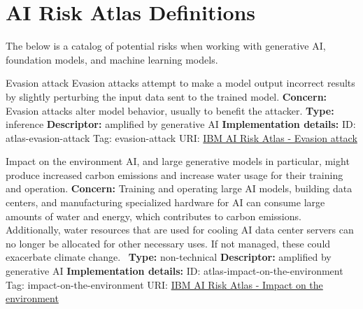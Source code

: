 \section{AI Risk Atlas Definitions}
The below is a catalog of potential risks when working with generative AI, foundation models, and machine learning models.


\begin{definitionbox}{Evasion attack}
Evasion attacks attempt to make a model output incorrect results by slightly perturbing the input data sent to the trained model.\newline\newline
\textbf{Concern: }Evasion attacks alter model behavior, usually to benefit the attacker.\newline\newline
\textbf{Type: }inference\newline
\textbf{Descriptor: }amplified by generative AI \newline\newline
\textbf{Implementation details: } \newline
ID: atlas-evasion-attack \newline
Tag: evasion-attack \newline
URI:  \href{https://www.ibm.com/docs/en/watsonx/saas?topic=SSYOK8/wsj/ai-risk-atlas/evasion-attack.html}{IBM AI Risk Atlas - Evasion attack}\newline
\end{definitionbox}
\begin{definitionbox}{Impact on the environment}
AI, and large generative models in particular, might produce increased carbon emissions and increase water usage for their training and operation.\newline\newline
\textbf{Concern: }Training and operating large AI models, building data centers, and manufacturing specialized hardware for AI can consume large amounts of water and energy, which contributes to carbon emissions. Additionally, water resources that are used for cooling AI data center servers can no longer be allocated for other necessary uses. If not managed, these could exacerbate climate change. \newline\newline
\textbf{Type: }non-technical\newline
\textbf{Descriptor: }amplified by generative AI \newline\newline
\textbf{Implementation details: } \newline
ID: atlas-impact-on-the-environment \newline
Tag: impact-on-the-environment \newline
URI:  \href{https://www.ibm.com/docs/en/watsonx/saas?topic=SSYOK8/wsj/ai-risk-atlas/impact-on-the-environment.html}{IBM AI Risk Atlas - Impact on the environment}\newline
\end{definitionbox}
